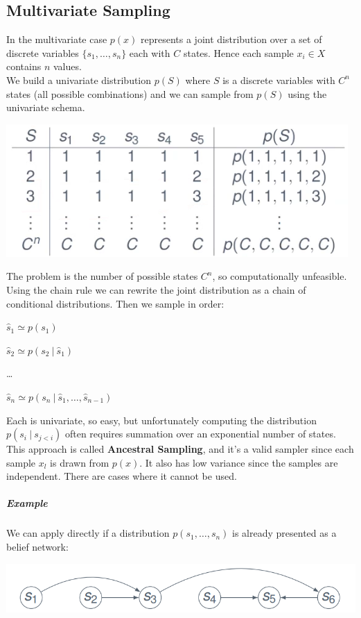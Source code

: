 \documentclass[10pt]{report}
\begin{document}
\subsection{Multivariate Sampling}
In the multivariate case $p(x)$ represents a joint distribution over a set of discrete variables $\{s_1,\ldots,s_n\}$ each with $C$ states. Hence each sample $x_i\in X$ contains $n$ values.\\
We build a univariate distribution $p(S)$ where $S$ is a discrete variables with $C^n$ states (all possible combinations) and we can sample from $p(S)$ using the univariate schema.
\begin{center}
	\includegraphics[scale=0.5]{44.png}
\end{center}
The problem is the number of possible states $C^n$, so computationally unfeasible.\\
Using the chain rule we can rewrite the joint distribution as a chain of conditional distributions. Then we sample in order:
\begin{list}{}{}
	\item $\hat{s}_1 \simeq p(s_1)$
	\item $\hat{s}_2 \simeq p(s_2\:|\:\hat{s}_1)$
	\item \ldots
	\item $\hat{s}_n \simeq p(s_n\:|\:\hat{s}_1,\ldots,\hat{s}_{n-1})$
\end{list}
Each is univariate, so easy, but unfortunately computing the distribution $p(s_i\:|\:s_{j<i})$ often requires summation over an exponential number of states.\\
This approach is called \textbf{Ancestral Sampling}, and it's a valid sampler since each sample $x_l$ is drawn from $p(x)$. It also has low variance since the samples are independent. There are cases where it cannot be used.
\subparagraph{Example} We can apply directly if a distribution $p(s_1,\ldots,s_n)$ is already presented as a belief network:
\begin{center}
	\includegraphics[scale=0.5]{67.png}
\end{center}
\end{document}
